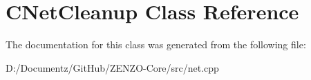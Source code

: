 \hypertarget{class_c_net_cleanup}{}\section{C\+Net\+Cleanup Class Reference}
\label{class_c_net_cleanup}


The documentation for this class was generated from the following file\+:\begin{DoxyCompactItemize}
\item 
D\+:/\+Documentz/\+Git\+Hub/\+Z\+E\+N\+Z\+O-\/\+Core/src/net.\+cpp\end{DoxyCompactItemize}

